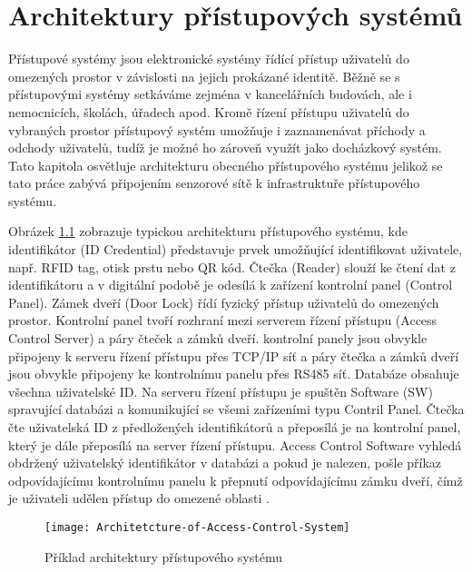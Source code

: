 \chapter{Architektury přístupových systémů}
\DIFaddbegin \label{Architektury přístupových systémů}
\DIFaddend Přístupové systémy jsou elektronické systémy řídící přístup uživatelů do omezených prostor v závislosti na jejich prokázané identitě. 
Běžně se s přístupovými systémy setkáváme zejména v kancelářních budovách, ale i nemocnicích, školách, úřadech apod.
Kromě řízení přístupu uživatelů do vybraných prostor přístupový systém umožňuje i zaznamenávat příchody a odchody uživatelů, tudíž je možné ho zároveň využít jako docházkový systém.
Tato kapitola osvětluje architekturu obecného přístupového systému jelikož se tato práce zabývá připojením senzorové sítě k infrastruktuře přístupového systému. 


Obrázek \ref{fig:Access control system architecture} zobrazuje typickou architekturu přístupového systému, kde identifikátor (ID Credential) představuje prvek umožňující identifikovat uživatele, např. RFID tag, otisk prstu nebo QR kód. 
Čtečka (Reader) slouží ke čtení dat z identifikátoru a v digitální podobě je odesílá k zařízení kontrolní panel (Control Panel).
Zámek dveří (Door Lock) řídí fyzický přístup uživatelů do omezených prostor. 
Kontrolní panel tvoří rozhraní mezi serverem řízení přístupu (Access Control Server) a páry čteček a zámků dveří.
kontrolní panely jsou obvykle připojeny k serveru řízení přístupu přes TCP/IP síť a páry čtečka a zámků dveří jsou obvykle připojeny ke kontrolnímu panelu přes RS485 síť. Databáze obsahuje všechna uživatelské ID.
Na serveru řízení přístupu je spuštěn Software (SW) spravující databázi a komunikující se všemi zařízeními typu Contril Panel.
Čtečka čte uživatelská ID z předložených identifikátorů a přeposílá je na kontrolní panel, který je dále přeposílá na server řízení přístupu. 
Access Control Software vyhledá obdržený uživatelský identifikátor v databázi a pokud je nalezen, pošle příkaz odpovídajícímu kontrolnímu panelu k přepnutí odpovídajícímu zámku dveří, čímž je uživateli udělen přístup do omezené oblasti \cite{accessControlSystem_eiprocus}.


\begin{figure}[!h]
    \centering
    \texttt{[image: Architetcture-of-Access-Control-System]}
    \caption{Příklad architektury přístupového systému \cite{accessControlSystem_eiprocus}}
    \label{fig:Access control system architecture}
\end{figure}

